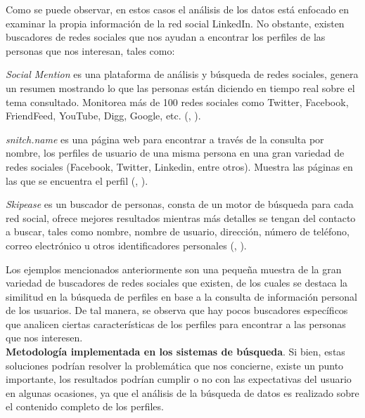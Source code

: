  
Como se puede observar, en estos casos el análisis de los datos está enfocado en examinar la propia información de la red social LinkedIn. No obstante, existen buscadores de redes sociales que nos ayudan a encontrar los perfiles de las personas que nos interesan, tales como:

\textit{Social Mention} es una plataforma de análisis y búsqueda de redes sociales, genera un resumen mostrando lo que las personas están diciendo en tiempo real sobre el tema consultado. Monitorea más de 100 redes sociales como Twitter, Facebook, FriendFeed, YouTube, Digg, Google, etc. (\citeauthor{link_socialmention}, \citeyear{link_socialmention}).

\textit{snitch.name} es una página web para encontrar a través de la consulta por nombre, los perfiles de usuario de una misma persona en una gran variedad de redes sociales (Facebook, Twitter, Linkedin, entre otros). Muestra las páginas en las que se encuentra el perfil (\citeauthor{link_snitchname}, \citeyear{link_snitchname}).

\textit{Skipease} es un buscador de personas, consta de un motor de búsqueda para cada red social, ofrece mejores resultados mientras más detalles se tengan del contacto a buscar, tales como  nombre, nombre de usuario, dirección, número de teléfono, correo electrónico u otros identificadores personales (\citeauthor{link_skipease}, \citeyear{link_skipease}).

Los ejemplos mencionados anteriormente son una pequeña muestra de la gran variedad de buscadores de redes sociales que existen, de los cuales se destaca la similitud en la búsqueda de perfiles en base a la consulta de información personal de los usuarios. De tal manera, se observa que hay pocos buscadores específicos que analicen ciertas características de los perfiles para encontrar a las personas que nos interesen. \\


% 
% 
% 

\textbf{Metodología implementada en los sistemas de búsqueda}.
Si bien, estas soluciones podrían resolver la problemática que nos concierne, existe un punto importante, los resultados podrían cumplir o no con las expectativas del usuario en algunas ocasiones, ya que el análisis de la búsqueda de datos es realizado sobre el contenido completo de los perfiles.


